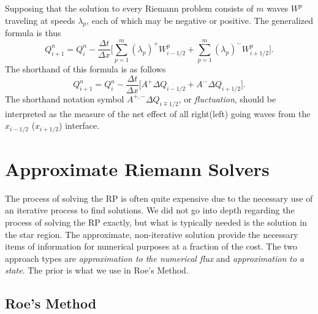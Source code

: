 \documentclass[]{article}
\begin{document}
	Supposing that the solution to every Riemann problem consists of $ m $ waves $ W^p $ traveling at speeds $ \lambda_p $, each of which may be negative or positive. The generalized formula is thus
	\begin{equation}
		Q^n_{i+1} = Q_i^n - \frac{\Delta t}{\Delta x} \Big[\sum_{p = 1}^{m} (\lambda_p)^+ W^p_{i-1/2} + \sum_{p = 1}^{m}(\lambda_p)^- W^p_{i+1/2} \Big].
	\end{equation}
	The shorthand of this formula is as follows	
	\begin{equation}
		Q^n_{i+1} = Q_i^n - \frac{\Delta t}{\Delta x} \Big[A^+\Delta Q_{i-1/2} + A^-\Delta Q_{i+1/2} \Big].
	\end{equation}
	The shorthand notation symbol $ A^{+,-} \Delta Q_{i\mp1/2}$, or \textit{fluctuation}, should be interpreted as the measure of the net effect of all right(left) going waves from the $ x_{i-1/2} $ ($ x_{i+1/2} $) interface.
	 

\section{Approximate Riemann Solvers}
	The process of solving the RP is often quite expensive due to the necessary use of an iterative process to find solutions. We did not go into depth regarding the process of solving the RP exactly, but what is typically needed is the solution in the star region.  The approximate, non-iterative solution provide the necessary items of information for numerical purposes at a fraction of the cost. The two approach types are \textit{approximation to the numerical flux} and \textit{approximation to a state}. The prior is what we use in Roe's Method.
		
	\subsection{Roe's Method}
	
\end{document}
